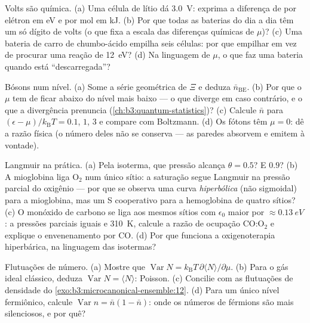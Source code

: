 \begin{exercise}[$\star$]\label{exo:b3:grand-canonical:4}
Volts são química. (a) Uma célula de lítio dá \qty{3.0}{V}:
exprima a diferença de  por elétron em eV e
por mol em kJ. (b) Por que todas as baterias do dia a dia têm um só
dígito de volts (o que fixa a escala das diferenças químicas de $\mu$)?
(c) Uma bateria de carro de chumbo-ácido empilha seis células: por que
empilhar em vez de procurar uma reação de \qty{12}{eV}? (d) Na
linguagem de $\mu$, o que faz uma bateria quando está ``descarregada''?
\end{exercise}

\begin{exercise}[$\star\star$]\label{exo:b3:grand-canonical:5}
Bósons num nível. (a) Some a série geométrica de $\Xi$ e deduza
$\bar n_{\text{BE}}$. (b) Por que o $\mu$ tem de ficar abaixo do
nível mais baixo --- o que diverge em caso contrário, e o que a
divergência prenuncia (\cref{ch:b3:quantum-statistics})? (c)
Calcule $\bar n$ para $(\epsilon - \mu)/k_{\text{B}}T = 0.1$, $1$,
$3$ e compare com Boltzmann. (d) Os fótons têm $\mu = 0$: dê a
razão física (o número deles não se conserva --- as paredes
absorvem e emitem à vontade).
\end{exercise}

\begin{exercise}[$\star\star$]\label{exo:b3:grand-canonical:6}
Langmuir na prática. (a) Pela isoterma, que pressão alcança
$\theta = 0.5$? E $0.9$? (b) A mioglobina liga O$_2$ num único sítio:
a saturação segue Langmuir na pressão parcial do oxigênio ---
por que se observa uma curva \emph{hiperbólica} (não sigmoidal) para a
mioglobina, mas um S cooperativo para a hemoglobina de quatro sítios?
(c) O monóxido de carbono se liga aos mesmos sítios com $\epsilon_0$
maior por $\approx\qty{0.13}{eV}$: a pressões parciais iguais e
\qty{310}{K}, calcule a razão de ocupação CO:O$_2$ e explique o
envenenamento por CO. (d) Por que funciona a oxigenoterapia
hiperbárica, na linguagem das isotermas?
\end{exercise}

\begin{exercise}[$\star\star$]\label{exo:b3:grand-canonical:7}
Flutuações de número. (a) Mostre que $\operatorname{Var}N =
k_{\text{B}}T\,\partial\langle N\rangle/\partial\mu$. (b) Para o
gás ideal clássico, deduza $\operatorname{Var}N = \langle
N\rangle$: Poisson. (c) Concilie com as flutuações de densidade do
\cref{exo:b3:microcanonical-ensemble:12}. (d) Para um único
nível fermiônico, calcule $\operatorname{Var}n = \bar n(1 - \bar
n)$: onde os números de férmions são mais silenciosos, e por quê?
\end{exercise}

